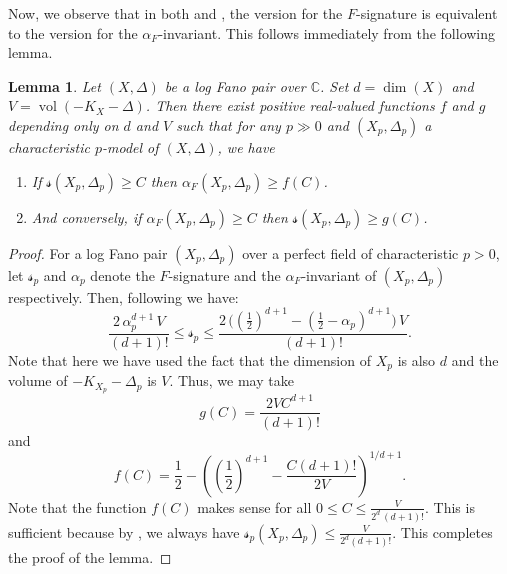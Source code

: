 \documentclass[11pt,reqno]{amsart}
\newcommand{\C}{\mathbb{C}}
\DeclareMathOperator{\vol}{vol}
\numberwithin{equation}{section}
\newtheorem{lem}[prop] {Lemma}
\theoremstyle{definition}
\newcommand{\FA}{\alpha_{F}}
\newcommand{\s}{\mathscr{s}}
\begin{document}
Now, we observe that in both  and , the version for the $F$-signature is equivalent to the version for the $\FA$-invariant. This follows immediately from the following lemma.

\begin{lem} \label{alphavss}
Let $(X, \Delta)$ be a log Fano pair over $\C$. Set $d = \dim (X)$ and $V = \vol(-K_X - \Delta)$. Then there exist positive real-valued functions $f$ and $g$ depending only on $d$ and $V$ such that
for any $p \gg 0$ and $(X_p, \Delta_p)$ a characteristic $p$-model of $(X, \Delta)$, we have
\begin{enumerate}
    \item If $\s (X_p, \Delta_p) \geq C$ then $\FA(X_p, \Delta_p) \geq f(C)$.
    \item And conversely, if $\FA(X_p, \Delta_p) \geq C$ then $\s (X_p, \Delta_p) \geq g(C)$.
\end{enumerate}
\end{lem}
\begin{proof}
For a log Fano pair $(X_p, \Delta_p)$ over a perfect field of characteristic $p>0$, let $\s_p$ and $\alpha_p$ denote the $F$-signature and the $\FA$-invariant of $(X_p, \Delta_p)$ respectively. Then, following \cite[Theorem 4.7]{PandeFrobeniusAlpha} we have:
$$ \frac{2 \, \alpha_p ^{d+1} \,  V}{(d+1)!} \leq \s_p \leq  \frac{2 \, \big( (\frac{1}{2})^{d+1} - (\frac{1}{2} - \alpha_p) ^{d+1} \big) \, V}{(d+1)!}. $$
Note that here we have used the fact that the dimension of $X_p$ is also $d$ and the volume of $-K_{X_p} - \Delta_p$ is $V$. Thus, we may take
\[ g(C) = \frac{2V C^{d+1}}{(d+1)!} \]
and 
\[ f(C) = \frac{1}{2} -  \left( \left(\frac{1}{2} \right)^{d+1} - \frac{C (d+1)!}{2V} \right )^{1/d+1} .\]
Note that the function $f(C)$ makes sense for all $ 0 \leq C \leq \frac{V}{2^d \, (d+1)!}$. This is sufficient because by \cite[Corollary 4.8]{PandeFrobeniusAlpha}, we always have $\s_p (X_p, \Delta_p) \leq \frac{V}{2^d (d+1)!}$. This completes the proof of the lemma.
\end{proof}
\end{document}
